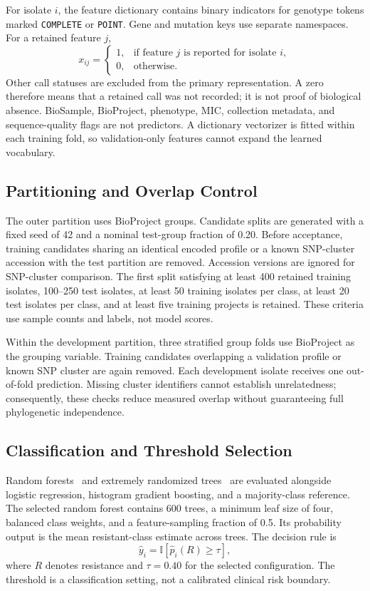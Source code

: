 \documentclass[conference]{IEEEtran}
\begin{document}
For isolate $i$, the feature dictionary contains binary indicators for genotype tokens marked \texttt{COMPLETE} or \texttt{POINT}. Gene and mutation keys use separate namespaces. For a retained feature $j$,
\begin{equation}
x_{ij}=\begin{cases}1,&\text{if feature }j\text{ is reported for isolate }i,\\0,&\text{otherwise.}\end{cases}
\end{equation}
Other call statuses are excluded from the primary representation. A zero therefore means that a retained call was not recorded; it is not proof of biological absence. BioSample, BioProject, phenotype, MIC, collection metadata, and sequence-quality flags are not predictors. A dictionary vectorizer is fitted within each training fold, so validation-only features cannot expand the learned vocabulary.

\subsection{Partitioning and Overlap Control}
The outer partition uses BioProject groups. Candidate splits are generated with a fixed seed of 42 and a nominal test-group fraction of 0.20. Before acceptance, training candidates sharing an identical encoded profile or a known SNP-cluster accession with the test partition are removed. Accession versions are ignored for SNP-cluster comparison. The first split satisfying at least 400 retained training isolates, 100--250 test isolates, at least 50 training isolates per class, at least 20 test isolates per class, and at least five training projects is retained. These criteria use sample counts and labels, not model scores.

Within the development partition, three stratified group folds use BioProject as the grouping variable. Training candidates overlapping a validation profile or known SNP cluster are again removed. Each development isolate receives one out-of-fold prediction. Missing cluster identifiers cannot establish unrelatedness; consequently, these checks reduce measured overlap without guaranteeing full phylogenetic independence.

\subsection{Classification and Threshold Selection}
Random forests~\cite{rf} and extremely randomized trees~\cite{extra} are evaluated alongside logistic regression, histogram gradient boosting, and a majority-class reference. The selected random forest contains 600 trees, a minimum leaf size of four, balanced class weights, and a feature-sampling fraction of 0.5. Its probability output is the mean resistant-class estimate across trees. The decision rule is
\begin{equation}
\widehat y_i=\mathbb{I}\!\left[\widehat p_i(R)\geq\tau\right],
\end{equation}
where $R$ denotes resistance and $\tau=0.40$ for the selected configuration. The threshold is a classification setting, not a calibrated clinical risk boundary.
\end{document}
